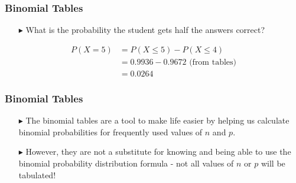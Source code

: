 \documentclass[12pt]{beamer}
\begin{document}
\begin{frame}
	\frametitle{Binomial Tables}
	
	\begin{itemize}
		\item[\color{blue}$\blacktriangleright$] What is the probability the student gets half the answers correct?
	\end{itemize}
	
	\vspace{0.5cm}
	
	\begin{align*}
		P(X = 5) &= P(X \leq 5) - P(X \leq 4) \\
		&= 0.9936 - 0.9672 \text{ (from tables)} \\
		&= 0.0264
	\end{align*}
	
\end{frame}
 \begin{frame}
 	\frametitle{Binomial Tables}
 	
 	\begin{itemize}
 		\item[\color{blue}$\blacktriangleright$] The binomial tables are a tool to make life easier by helping us calculate binomial probabilities for frequently used values of $n$ and $p$.
 		
 		\item[\color{blue}$\blacktriangleright$] However, they are not a substitute for knowing and being able to use the binomial probability distribution formula - not all values of $n$ or $p$ will be tabulated!
 	\end{itemize}
 	
 \end{frame}
 
\end{document}
